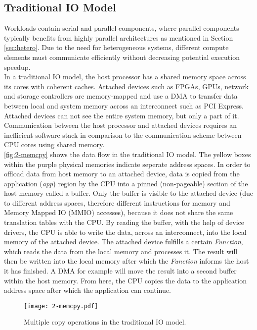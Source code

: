 \subsection{Traditional IO Model}
\label{sec:copies}
Workloads contain serial and parallel components, where parallel components typically benefits from highly parallel architectures as mentioned in Section \ref{sec:hetero}. Due to the need for heterogeneous systems, different compute elements must communicate efficiently without decreasing potential execution speedup.\\
In a traditional IO model, the host processor has a shared memory space across its cores with coherent caches. Attached devices such as FPGAs, GPUs, network and storage controllers are memory-mapped and use a DMA to transfer data between local and system memory across an interconnect such as PCI Express. Attached devices can not see the entire system memory, but only a part of it. Communication between the host processor and attached devices requires an inefficient software stack in comparison to the communication scheme between CPU cores using shared memory.\\
\autoref{fig:2-memcpy} shows the data flow in the traditional IO model. The yellow boxes within the purple physical memories indicate seperate address spaces. In order to offload data from host memory to an attached device, data is copied from the application (\textit{app}) region by the CPU into a pinned (non-pageable) section of the host memory called a buffer. Only the buffer is visible to the attached device (due to different address spaces, therefore different instructions for memory and Memory Mapped IO (MMIO) accesses), because it does not share the same translation tables with the CPU. By reading the buffer, with the help of device drivers, the CPU is able to write the data, across an interconnect, into the local memory of the attached device. The attached device fulfills a certain \textit{Function}, which reads the data from the local memory and processes it. The result will then be written into the local memory after which the \textit{Function} informs the host it has finished. A DMA for example will move the result into a second buffer within the host memory. From here, the CPU copies the data to the application address space after which the application can continue.

\begin{figure}[H]
  \centering
  \texttt{[image: 2-memcpy.pdf]}
  \caption{Multiple copy operations in the traditional IO model.}
  \label{fig:2-memcpy}
\end{figure}



